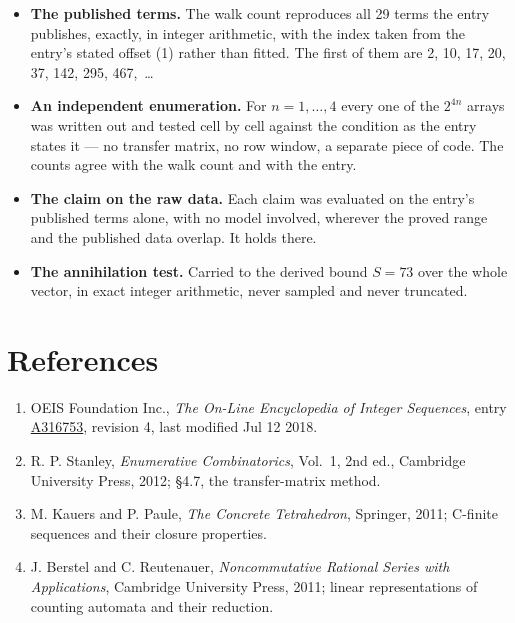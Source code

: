 \documentclass[11pt]{article}
\theoremstyle{definition}
\begin{document}
\begin{itemize}

\item {\bfseries The published terms.} The walk count reproduces all 29 terms the entry publishes, exactly, in integer arithmetic, with the index taken from the entry's stated offset (1) rather than fitted. The first of them are 2, 10, 17, 20, 37, 142, 295, 467,~\dots

\item {\bfseries An independent enumeration.} For $n = 1,\dots,4$ every one of the $2^{4n}$ arrays was written out and tested cell by cell against the condition as the entry states it --- no transfer matrix, no row window, a separate piece of code. The counts agree with the walk count and with the entry.

\item {\bfseries The claim on the raw data.} Each claim was evaluated on the entry's published terms alone, with no model involved, wherever the proved range and the published data overlap. It holds there.

\item {\bfseries The annihilation test.} Carried to the derived bound $S = 73$ over the whole vector, in exact integer arithmetic, never sampled and never truncated.

\end{itemize}

\section{References}

\begin{enumerate}

\item OEIS Foundation Inc., \emph{The On-Line Encyclopedia of Integer Sequences}, entry \href{https://oeis.org/A316753}{A316753}, revision 4, last modified Jul 12 2018.

\item R. P. Stanley, \emph{Enumerative Combinatorics}, Vol.~1, 2nd ed., Cambridge University Press, 2012; \S4.7, the transfer-matrix method.

\item M. Kauers and P. Paule, \emph{The Concrete Tetrahedron}, Springer, 2011; C-finite sequences and their closure properties.

\item J. Berstel and C. Reutenauer, \emph{Noncommutative Rational Series with Applications}, Cambridge University Press, 2011; linear representations of counting automata and their reduction.

\end{enumerate}
\end{document}
